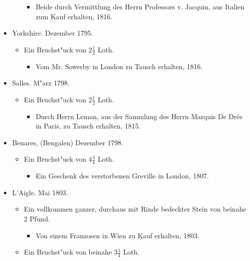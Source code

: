 \documentclass[a4paper, 11pt, oneside, polutonikogreek, german]{article}
\begin{document}
\begin{itemize}
\begin{itemize}
        \begin{itemize}
            \item Beide durch Vermittlung des Herrn Professors v. Jacquin, aus Italien zum Kauf erhalten, 1816.
        \end{itemize}
    \end{itemize}
    \item Yorkshire. Dezember 1795.
    \begin{itemize}
        \item Ein Bruchst"uck von $\mathfrak{2\frac{1}{2}}$ Loth.
        \begin{itemize}
            \item Vom Mr. Sowerby in London zu Tausch erhalten, 1816.
        \end{itemize}
    \end{itemize}
    \item Salles. M"arz 1798.
    \begin{itemize}
        \item Ein Bruchst"uck von $\mathfrak{2\frac{1}{2}}$ Loth.
        \begin{itemize}
            \item Durch Herrn Leman, aus der Sammlung des Herrn Marquis De Drée in Paris, zu Tausch erhalten, 1815.
        \end{itemize}
    \end{itemize}
    \item Benares, (Bengalen) Dezember 1798.
    \begin{itemize}
        \item Ein Bruchst"uck von $\mathfrak{4\frac{3}{4}}$ Loth.
        \begin{itemize}
            \item Ein Geschenk des verstorbenen Greville in London, 1807.
        \end{itemize}
    \end{itemize}
    \item L'Aigle. Mai 1803.
    \begin{itemize}
        \item Ein vollkommen ganzer, durchaus mit Rinde bedeckter Stein von beinahe 2 Pfund.
        \begin{itemize}
            \item Von einem Franzosen in Wien zu Kauf erhalten, 1803.
        \end{itemize}
        \item Ein Bruchst"uck von beinahe $\mathfrak{3\frac{1}{4}}$ Loth.

\end{itemize}
\end{itemize}
\end{document}
